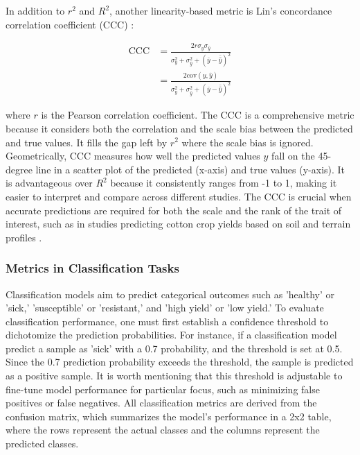 In addition to \(r^2\) and \(R^2\), another linearity-based metric is Lin's concordance correlation coefficient (CCC) \citep{lin_concordance_1989}:

\begin{equation} \label{eq_ccc}
\begin{aligned}
\text{CCC} &= \frac{2r \sigma_y \sigma_{\hat{y}}}{\sigma_y^2 + \sigma_{\hat{y}}^2 + (\bar{y} - \bar{\hat{y}})^2} \\
&= \frac{2 \text{cov}(y, \hat{y})}{\sigma_y^2 + \sigma_{\hat{y}}^2 + (\bar{y} - \bar{\hat{y}})^2}
\end{aligned}
\end{equation}

where $r$ is the Pearson correlation coefficient. The CCC is a comprehensive metric because it considers both the correlation and the scale bias between the predicted and true values. It fills the gap left by \(r^2\) where the scale bias is ignored. Geometrically, CCC measures how well the predicted values \(\hat{y}\) fall on the 45-degree line in a scatter plot of the predicted (x-axis) and true values (y-axis). It is advantageous over \(R^2\) because it consistently ranges from -1 to 1, making it easier to interpret and compare across different studies. The CCC is crucial when accurate predictions are required for both the scale and the rank of the trait of interest, such as in studies predicting cotton crop yields based on soil and terrain profiles \citep{jones_identifying_2022}.

\subsubsection{Metrics in Classification Tasks}

Classification models aim to predict categorical outcomes such as 'healthy' or 'sick,' 'susceptible' or 'resistant,' and 'high yield' or 'low yield.’ To evaluate classification performance, one must first establish a confidence threshold to dichotomize the prediction probabilities. For instance, if a classification model predict a sample as 'sick' with a 0.7 probability, and the threshold is set at 0.5. Since the 0.7 prediction probability exceeds the threshold, the sample is predicted as a positive sample. It is worth mentioning that this threshold is adjustable to fine-tune model performance for particular focus, such as minimizing false positives or false negatives. All classification metrics are derived from the confusion matrix, which summarizes the model's performance in a 2x2 table, where the rows represent the actual classes and the columns represent the predicted classes.

